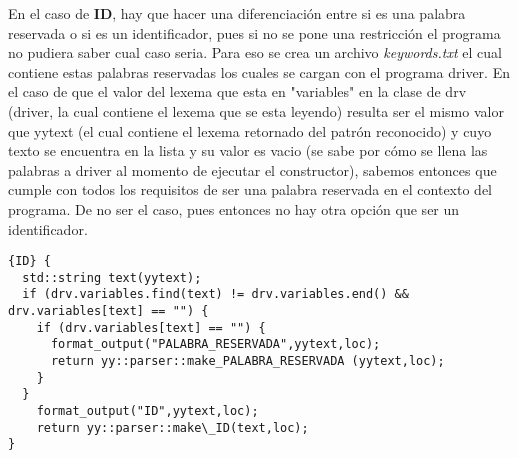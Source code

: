 En el caso de \textbf{ID}, hay que hacer una diferenciación entre si es una palabra reservada o si es un identificador, pues si no se pone una restricción el programa
no pudiera saber cual caso seria. Para eso se crea un archivo \textit{keywords.txt} el cual contiene estas palabras reservadas los cuales se cargan con el
programa driver. En el caso de que el valor del lexema que esta en "variables" en la clase de drv (driver, la cual contiene el lexema que se esta leyendo) resulta ser
el mismo valor que yytext (el cual contiene el lexema retornado del patrón reconocido) y cuyo texto se encuentra en la lista y su valor es vacio (se sabe por cómo se llena
las palabras a driver al momento de ejecutar el constructor), sabemos entonces que cumple con todos los requisitos de ser una palabra reservada en el contexto del programa.
De no ser el caso, pues entonces no hay otra opción que ser un identificador.

\begin{lstlisting}
{ID} {	
  std::string text(yytext);
  if (drv.variables.find(text) != drv.variables.end() && drv.variables[text] == "") {
    if (drv.variables[text] == "") {
      format_output("PALABRA_RESERVADA",yytext,loc);
      return yy::parser::make_PALABRA_RESERVADA (yytext,loc);
    }
  }
	format_output("ID",yytext,loc);
	return yy::parser::make\_ID(text,loc);
}
\end{lstlisting}